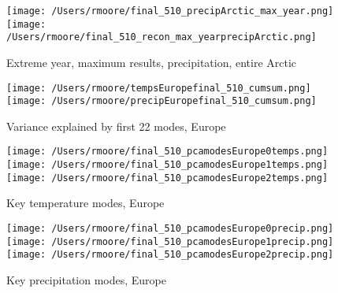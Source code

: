 \documentclass[11pt, oneside]{article}
\begin{document}
\begin{figure}[!htb]
    \centering
      \texttt{[image: /Users/rmoore/final\_510\_precipArctic\_max\_year.png]}
    \endminipage  
\\
      \texttt{[image: /Users/rmoore/final\_510\_recon\_max\_yearprecipArctic.png]}
    \endminipage 
    \caption{Extreme year, maximum results, precipitation, entire Arctic}\label{max_temp_arctic}
\end{figure}


\begin{figure}[!htb]
    \centering
    \centering
      \texttt{[image: /Users/rmoore/tempsEuropefinal\_510\_cumsum.png]}
    \endminipage
    \centering
      \texttt{[image: /Users/rmoore/precipEuropefinal\_510\_cumsum.png]}
    \endminipage
    \caption{Variance explained by first 22 modes, Europe}\label{PCA_cumsum_europe}
    \end{figure}

\begin{figure}[!htb]
    \centering
      \texttt{[image: /Users/rmoore/final\_510\_pcamodesEurope0temps.png]}
    \endminipage 
    \\
      \texttt{[image: /Users/rmoore/final\_510\_pcamodesEurope1temps.png]}
    \endminipage
    \\
      \texttt{[image: /Users/rmoore/final\_510\_pcamodesEurope2temps.png]}
    \endminipage
    \caption{Key temperature modes, Europe}\label{pca_temp_europe}
    \end{figure}

    \begin{figure}[!htb]
        \centering
          \texttt{[image: /Users/rmoore/final\_510\_pcamodesEurope0precip.png]}
        \endminipage 
        \\
          \texttt{[image: /Users/rmoore/final\_510\_pcamodesEurope1precip.png]}
        \endminipage
        \\
          \texttt{[image: /Users/rmoore/final\_510\_pcamodesEurope2precip.png]}
        \endminipage
        \caption{Key precipitation modes, Europe}\label{pca_precip_europe}
        \end{figure}
\end{document}

